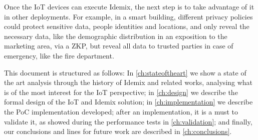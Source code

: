 Once the IoT devices can execute Idemix, the next step is to take advantage of it in other deployments. For example, in a smart building, different privacy policies could protect sensitive data, people identities and locations, and only reveal the necessary data, like the demographic distribution in an exposition to the marketing area, via a ZKP, but reveal all data to trusted parties in case of emergency, like the fire department. 

\hfil


This document is structured as follows: In \autoref{ch:stateoftheart} we show a state of the art analysis through the history of Idemix and related works, analysing what is of the most interest for the IoT perspective; in \autoref{ch:design} we describe the formal design of the IoT and Idemix solution; in \autoref{ch:implementation} we describe the PoC implementation developed; after an implementation, it is a must to validate it, as showed during the performance tests in \autoref{ch:validation}; and finally, our conclusions and lines for future work are described in \autoref{ch:conclusions}.